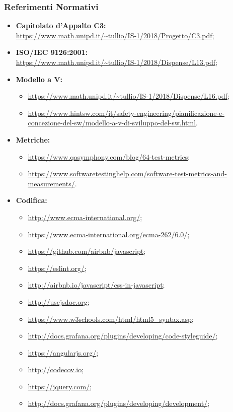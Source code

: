 \subsubsection{Referimenti Normativi}
\begin{itemize}
\item \textbf{Capitolato d'Appalto C3:}\\ \url{https://www.math.unipd.it/~tullio/IS-1/2018/Progetto/C3.pdf};
\item \textbf{ISO/IEC 9126:2001:}\\ \url{https://www.math.unipd.it/~tullio/IS-1/2018/Dispense/L13.pdf};
\item \textbf{Modello a V:}
\begin{itemize}
	\item \url{https://www.math.unipd.it/~tullio/IS-1/2018/Dispense/L16.pdf};
	\item \url{https://www.hintsw.com/it/safety-engineering/pianificazione-e-concezione-del-sw/modello-a-v-di-sviluppo-del-sw.html}.
\end{itemize}
\item \textbf{Metriche:}
	\begin{itemize}
	\item \url{https://www.qasymphony.com/blog/64-test-metrics};
	\item \url{https://www.softwaretestinghelp.com/software-test-metrics-and-measurements/}.
	\end{itemize}
\item \textbf{Codifica:}
	\begin{itemize}
	\item \url{http://www.ecma-international.org/};
	\item \url{https://www.ecma-international.org/ecma-262/6.0/};
	\item \url{https://github.com/airbnb/javascript};
	\item \url{https://eslint.org/};
	\item \url{http://airbnb.io/javascript/css-in-javascript};
	\item \url{http://usejsdoc.org};
	\item \url{https://www.w3schools.com/html/html5_syntax.asp};
	\item \url{http://docs.grafana.org/plugins/developing/code-styleguide/};
	\item \url{https://angularjs.org/};
	\item \url{http://codecov.io};
	\item \url{https://jquery.com/};
	\item \url{http://docs.grafana.org/plugins/developing/development/};

\end{itemize}
\end{itemize}
